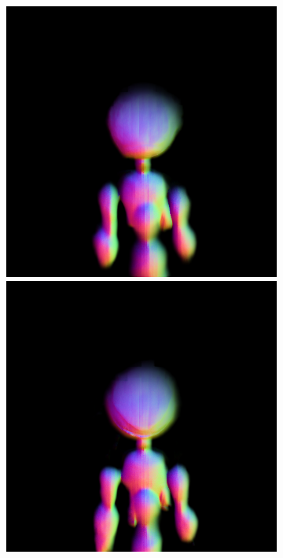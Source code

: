 \begin{figure}[ht]
\begin{subfigure}[b]{0.20\textwidth}
        \includegraphics[width=\textwidth]{figures/appendix/dreamfusion_plantrobot_5000_part2.png}
        \includegraphics[width=\textwidth]{figures/appendix//dreamfusion_plantrobot_10000_part2.png}

\end{subfigure}
\end{figure}

